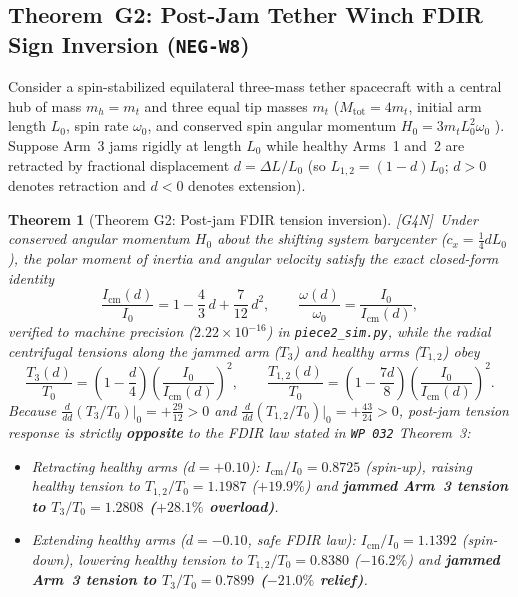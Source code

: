 \documentclass[11pt]{amsart}
\numberwithin{equation}{section}
\theoremstyle{plain}
\newtheorem{theorem}{Theorem}[section]
\theoremstyle{definition}\newtheorem{definition}[theorem]{Definition}
\theoremstyle{remark}\newtheorem{remark}[theorem]{Remark}
\newcommand{\ctag}[1]{\textup{\textsf{\scriptsize[#1]}}}
\begin{document}
\subsection{Theorem~G2: Post-Jam Tether Winch FDIR Sign Inversion (\texttt{NEG-W8})}
Consider a spin-stabilized equilateral three-mass tether spacecraft with a central hub of mass $m_h = m_t$ and three equal tip masses $m_t$ ($M_{\mathrm{tot}} = 4 m_t$, initial arm length $L_0$, spin rate $\omega_0$, and conserved spin angular momentum $H_0 = 3 m_t L_0^2 \omega_0$ \cite{beletsky1993}). Suppose Arm~3 jams rigidly at length $L_0$ while healthy Arms~1 and~2 are retracted by fractional displacement $d = \Delta L / L_0$ (so $L_{1,2} = (1-d)L_0$; $d > 0$ denotes retraction and $d < 0$ denotes extension).

\begin{theorem}[Theorem G2: Post-jam FDIR tension inversion]\label{thm:G2}
\ctag{G4N}\ Under conserved angular momentum $H_0$ about the shifting system barycenter ($c_x = \frac14 d L_0$), the polar moment of inertia and angular velocity satisfy the exact closed-form identity
\begin{equation}\label{eq:G2_I}
\frac{I_{\mathrm{cm}}(d)}{I_0} = 1 - \frac{4}{3}\,d + \frac{7}{12}\,d^2, \qquad \frac{\omega(d)}{\omega_0} = \frac{I_0}{I_{\mathrm{cm}}(d)},
\end{equation}
verified to machine precision ($2.22\times 10^{-16}$) in \texttt{piece2\_sim.py}, while the radial centrifugal tensions along the jammed arm ($T_3$) and healthy arms ($T_{1,2}$) obey
\begin{equation}\label{eq:G2_T}
\frac{T_3(d)}{T_0} = \left(1 - \frac{d}{4}\right)\!\left(\frac{I_0}{I_{\mathrm{cm}}(d)}\right)^2, \qquad
\frac{T_{1,2}(d)}{T_0} = \left(1 - \frac{7d}{8}\right)\!\left(\frac{I_0}{I_{\mathrm{cm}}(d)}\right)^2.
\end{equation}
Because $\frac{d}{dd}(T_3/T_0)|_0 = +\frac{29}{12} > 0$ and $\frac{d}{dd}(T_{1,2}/T_0)|_0 = +\frac{43}{24} > 0$, post-jam tension response is strictly \textbf{opposite} to the FDIR law stated in \texttt{WP~032} Theorem~3:
\begin{itemize}[nosep]
\item \emph{Retracting healthy arms ($d = +0.10$):} $I_{\mathrm{cm}}/I_0 = 0.8725$ (spin-up), raising healthy tension to $T_{1,2}/T_0 = 1.1987$ ($+19.9\%$) and \textbf{jammed Arm~3 tension to $T_3/T_0 = 1.2808$ ($+28.1\%$ overload)}.
\item \emph{Extending healthy arms ($d = -0.10$, safe FDIR law):} $I_{\mathrm{cm}}/I_0 = 1.1392$ (spin-down), lowering healthy tension to $T_{1,2}/T_0 = 0.8380$ ($-16.2\%$) and \textbf{jammed Arm~3 tension to $T_3/T_0 = 0.7899$ ($-21.0\%$ relief)}.
\end{itemize}
\end{theorem}
\end{document}
